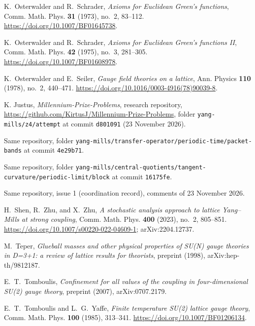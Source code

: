 K.~Osterwalder and R.~Schrader, \emph{Axioms for Euclidean Green's functions},
Comm. Math. Phys. \textbf{31} (1973), no.~2, 83--112.
\url{https://doi.org/10.1007/BF01645738}.

K.~Osterwalder and R.~Schrader, \emph{Axioms for Euclidean Green's functions II},
Comm. Math. Phys. \textbf{42} (1975), no.~3, 281--305.
\url{https://doi.org/10.1007/BF01608978}.

K.~Osterwalder and E.~Seiler, \emph{Gauge field theories on a lattice},
Ann. Physics \textbf{110} (1978), no.~2, 440--471.
\url{https://doi.org/10.1016/0003-4916(78)90039-8}.

 K. Justus, \emph{Millennium-Prize-Problems}, research repository, \url{https://github.com/KirtusJ/Millennium-Prize-Problems}, folder \texttt{yang-mills/z4/attempt} at commit \texttt{d801091} (23 November 2026).

 Same repository, folder \texttt{yang-mills/transfer-operator/periodic-time/packet-bands} at commit \texttt{4e29b71}.

 Same repository, folder \texttt{yang-mills/central-quotients/tangent-curvature/periodic-limit/block} at commit \texttt{16175fe}.

 Same repository, issue 1 (coordination record), comments of 23 November 2026.

H.~Shen, R.~Zhu, and X.~Zhu, \emph{A stochastic analysis approach to lattice Yang--Mills at strong coupling},
Comm. Math. Phys. \textbf{400} (2023), no.~2, 805--851.
\url{https://doi.org/10.1007/s00220-022-04609-1}; arXiv:2204.12737.

M.~Teper, \emph{Glueball masses and other physical properties of SU(N) gauge theories in D=3+1: a review of lattice results for theorists},
preprint (1998), arXiv:hep-th/9812187.

E.~T.~Tomboulis, \emph{Confinement for all values of the coupling in four-dimensional SU(2) gauge theory},
preprint (2007), arXiv:0707.2179.

E.~T.~Tomboulis and L.~G.~Yaffe, \emph{Finite temperature SU(2) lattice gauge theory},
Comm. Math. Phys. \textbf{100} (1985), 313--341.
\url{https://doi.org/10.1007/BF01206134}.
